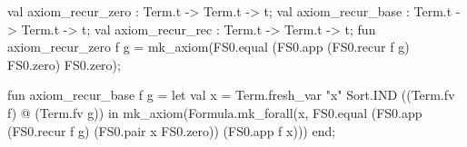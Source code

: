 \nwenddocs{}\plusendmoddef\nwstartdeflinemarkup{}\nwenddeflinemarkup
val axiom_recur_zero : Term.t -> Term.t -> t;
val axiom_recur_base : Term.t -> Term.t -> t;
val axiom_recur_rec : Term.t -> Term.t -> t;
\nwendcode{}\nwdocspar
\nwenddocs{}\plusendmoddef\nwstartdeflinemarkup{}\nwenddeflinemarkup
fun axiom_recur_zero f g =
  mk_axiom(FS0.equal (FS0.app (FS0.recur f g) FS0.zero)
                     FS0.zero);

fun axiom_recur_base f g =
  let val x = Term.fresh_var "x" Sort.IND ((Term.fv f) @ (Term.fv g))
  in mk_axiom(Formula.mk_forall(x,
                                FS0.equal (FS0.app (FS0.recur f g)
                                                   (FS0.pair x FS0.zero))
                                          (FS0.app f x)))
  end;

